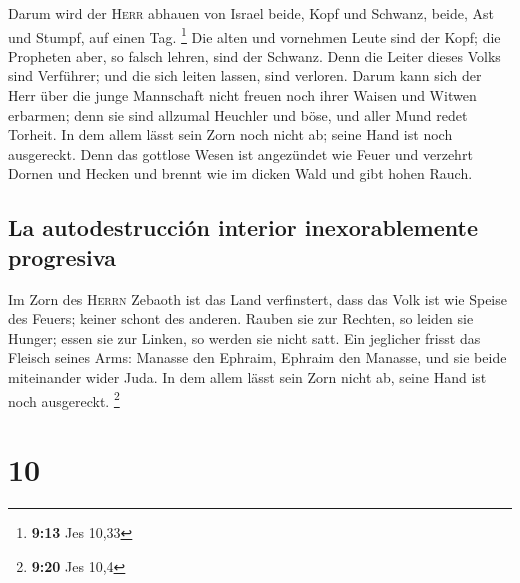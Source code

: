  Darum wird der \textsc{Herr} abhauen von Israel beide,
Kopf und Schwanz, beide, Ast und Stumpf, auf einen Tag. \footnote{\textbf{9:13}
  Jes 10,33}  Die alten und vornehmen Leute sind der
Kopf; die Propheten aber, so falsch lehren, sind der Schwanz.
 Denn die Leiter dieses Volks sind Verführer; und die
sich leiten lassen, sind verloren.  Darum kann sich der
Herr über die junge Mannschaft nicht freuen noch ihrer Waisen und Witwen
erbarmen; denn sie sind allzumal Heuchler und böse, und aller Mund redet
Torheit. In dem allem lässt sein Zorn noch nicht ab; seine Hand ist noch
ausgereckt.  Denn das gottlose Wesen ist angezündet wie
Feuer und verzehrt Dornen und Hecken und brennt wie im dicken Wald und
gibt hohen Rauch.

\hypertarget{la-autodestrucciuxf3n-interior-inexorablemente-progresiva}{%
\subsection{La autodestrucción interior inexorablemente
progresiva}\label{la-autodestrucciuxf3n-interior-inexorablemente-progresiva}}

 Im Zorn des \textsc{Herrn} Zebaoth ist das Land
verfinstert, dass das Volk ist wie Speise des Feuers; keiner schont des
anderen.  Rauben sie zur Rechten, so leiden sie Hunger;
essen sie zur Linken, so werden sie nicht satt. Ein jeglicher frisst das
Fleisch seines Arms:  Manasse den Ephraim, Ephraim den
Manasse, und sie beide miteinander wider Juda. In dem allem lässt sein
Zorn nicht ab, seine Hand ist noch ausgereckt. \footnote{\textbf{9:20}
  Jes 10,4}

\hypertarget{section-9}{%
\section{10}\label{section-9}}

